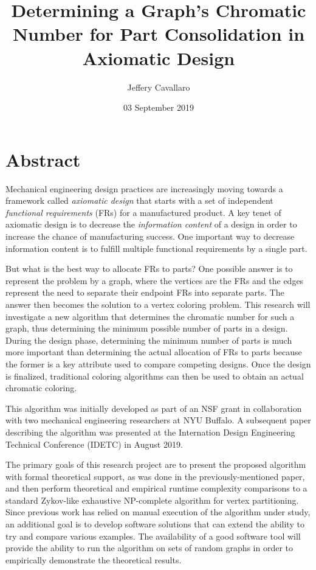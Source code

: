 \documentclass[letterpaper,12pt]{article}
\begin{document}
\title{Determining a Graph's Chromatic Number for Part Consolidation in Axiomatic Design}
\author{Jeffery Cavallaro}
\date{03 September 2019}
\maketitle
\section*{Abstract}
Mechanical engineering design practices are increasingly moving towards a framework called \emph{axiomatic design}
that starts with a set of independent \emph{functional requirements} (FRs) for a manufactured product.  A key tenet
of axiomatic design is to decrease the \emph{information content} of a design in order to increase the chance of
manufacturing success.  One important way to decrease information content is to fulfill multiple functional
requirements by a single part.

But what is the best way to allocate FRs to parts?  One possible answer is to represent the problem by a graph,
where the vertices are the FRs and the edges represent the need to separate their endpoint FRs into separate parts.
The answer then becomes the solution to a vertex coloring problem.  This research will investigate a new algorithm
that determines the chromatic number for such a graph, thus determining the minimum possible number of parts in a
design.  During the design phase, determining the minimum number of parts is much more important than determining
the actual allocation of FRs to parts because the former is a key attribute used to compare competing designs.
Once the design is finalized, traditional coloring algorithms can then be used to obtain an actual chromatic
coloring.

This algorithm was initially developed as part of an NSF grant in collaboration with two mechanical engineering
researchers at NYU Buffalo.  A subsequent paper describing the algorithm was presented at the Internation Design
Engineering Technical Conference (IDETC) in August 2019.

The primary goals of this research project are to present the proposed algorithm with formal theoretical support, as
was done in the previously-mentioned paper, and then perform theoretical and empirical runtime complexity comparisons
to a standard Zykov-like exhaustive NP-complete algorithm for vertex partitioning.  Since previous work has relied on
manual execution of the algorithm under study, an additional goal is to develop software solutions that can extend the
ability to try and compare various examples.  The availability of a good software tool will provide the ability to run
the algorithm on sets of random graphs in order to empirically demonstrate the theoretical results.
\end{document}
